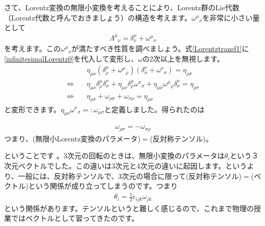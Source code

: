\documentclass[report,paper=a4, fontsize=12pt, line_length=16cm, number_of_lines=33,dvipdfmx]{jlreq}
\newenvironment{important}{\begin{tcolorbox}[
  colback = white,
  colframe = red!35,
  boxrule = 2mm,
  fonttitle = \bfseries,
  after = \noindent] }{\end{tcolorbox}}
\numberwithin{equation}{chapter}
\begin{document}
さて、Lorentz変換の無限小変換を考えることにより、Lorentz群のLie代数（Lorentz代数と呼んでおきましょう）の構造を考えます。$\omega^{\mu}{}_{\nu}$を非常に小さい量として
\begin{align}
  \Lambda^{\mu}{}_{\nu}=\delta^{\mu}_{\nu}+\omega^{\mu}{}_{\nu}\label{infinitesimalLorentz0}
\end{align}
を考えます。この$\omega^{\mu}{}_{\nu}$が満たすべき性質を調べましょう。式\eqref{Lorentztransf1}に\eqref{infinitesimalLorentz0}を代入して変形し、$\omega$の2次以上を無視します。
\begin{align}
  &\eta_{\mu\nu}(\delta^{\mu}_{\rho}+\omega^{\mu}{}_{\rho})(\delta^{\nu}_{\sigma}+\omega^{\nu}{}_{\sigma})=\eta_{\rho\sigma}\\
  \Leftrightarrow\quad&\eta_{\mu\nu}\delta^{\mu}_{\rho}\delta^{\nu}_{\sigma}+\eta_{\mu\nu}\delta^{\mu}_{\rho}\omega^{\nu}{}_{\sigma}+\eta_{\mu\nu}\omega^{\mu}{}_{\rho}\delta^{\nu}_{\sigma}=\eta_{\rho\sigma}\\
  \Leftrightarrow\quad&\eta_{\rho\sigma}+\omega_{\rho\sigma}+\omega_{\sigma\rho}=\eta_{\rho\sigma}
\end{align}
と変形できます。$\eta_{\mu\nu}\omega^{\nu}{}_{\sigma}=:\omega_{\mu\sigma}$と定義しました。得られたのは
\begin{important}
  \begin{align}
    \omega_{\rho\sigma}=-\omega_{\sigma\rho}\label{infinitesimalLorentz1}
  \end{align}
  つまり、(無限小Lorentz変換のパラメータ)$=$(反対称テンソル)。
\end{important}
ということです
。3次元の回転のときは、無限小変換のパラメータは$\theta_i$という３次元ベクトルでした。この違いは3次元と4次元の違いに起因します。というより、一般には、反対称テンソルで、3次元の場合に限って(反対称テンソル)$=$(ベクトル)という関係が成り立ってしまうのです。つまり
\begin{align}
  \theta_{i}=\frac12 \epsilon_{ijk}\omega_{jk}
\end{align}
という関係があります。テンソルというと難しく感じるので、これまで物理の授業ではベクトルとして習ってきたのです。
\end{document}
